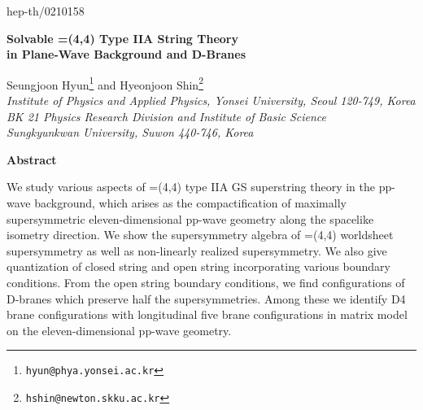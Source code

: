 \documentclass[a4paper,12pt]{article}
\begin{document}
\renewcommand{\thefootnote}{\fnsymbol{footnote}}

\begin{titlepage}
\hfill{hep-th/0210158}
\vspace{15mm}
\baselineskip 8mm

\begin{center}
{\LARGE \bf Solvable \coordHE{}=(4,4) Type IIA String Theory \\ 
in Plane-Wave Background and D-Branes}
\end{center}
\baselineskip 6mm
\vspace{10mm}
\begin{center}
Seungjoon Hyun\coordHE{}\footnote{\tt hyun@phya.yonsei.ac.kr}
and
Hyeonjoon Shin\coordHE{}\footnote{\tt hshin@newton.skku.ac.kr} \\[5mm]
{\it
{}\coordHE{} Institute of Physics and Applied Physics, Yonsei University,
Seoul 120-749, Korea \\
\coordHE{} BK 21 Physics Research Division and Institute of Basic Science \\
Sungkyunkwan University, Suwon 440-746, Korea}
\end{center}

\thispagestyle{empty}


\vfill

\begin{center}
{\bf Abstract}
\end{center}
\noindent 
We study various aspects of \coordHE{}=(4,4) type IIA GS superstring theory
in the pp-wave background, which arises as the compactification of maximally
supersymmetric eleven-dimensional pp-wave geometry along the spacelike
isometry direction. We show the supersymmetry algebra of \coordHE{}=(4,4)
worldsheet supersymmetry as well as non-linearly realized supersymmetry.
We also give quantization of closed string and open string incorporating 
various boundary conditions. From the open string boundary conditions, we
find configurations of D-branes which preserve half the supersymmetries. 
Among these we identify D4 brane configurations with longitudinal five brane
configurations in matrix model on the eleven-dimensional pp-wave geometry. 


\vspace{20mm}
\end{titlepage}

\baselineskip 6.5mm
\renewcommand{\thefootnote}{\arabic{footnote}}
\setcounter{footnote}{0}
\end{document}
